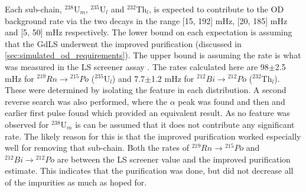 \par
Each sub-chain, ${}^{238}$U$_{m}$, ${}^{235}$U$_{l}$ and ${}^{232}$Th$_{l}$, is expected to contribute to the OD background rate via the two decays in the range [15, 192] mHz, [20, 185] mHz and [5, 50] mHz respectively.
The lower bound on each expectation is assuming that the GdLS underwent the improved purification (discussed in \autoref{sec:simulated_od_requirements}).
The upper bound is assuming the rate is what was measured in the LS screener assay \cite{scotthaselschwardt_thesis_ref}.
The rates calculated here are 98$\pm$2.5 mHz for ${}^{219}Rn \to {}^{215}Po$ (${}^{235}$U$_{l}$) and 7.7$\pm$1.2 mHz for ${}^{212}Bi \to {}^{212}Po$ (${}^{232}$Th$_{l}$).
These were determined by isolating the feature in each distribution.
A second reverse search was also performed, where the $\alpha$ peak was found and then and earlier first pulse found which provided an equivalent result.
As no feature was observed for ${}^{238}$U$_{m}$ is can be assumed that it does not contribute any significant rate.
The likely reason for this is that the improved purification worked especially well for removing that sub-chain.
Both the rates of ${}^{219}Rn \to {}^{215}Po$ and ${}^{212}Bi \to {}^{212}Po$ are between the LS screener value and the improved purification estimate.
This indicates that the purification was done, but did not decrease all of the impurities as much as hoped for.

